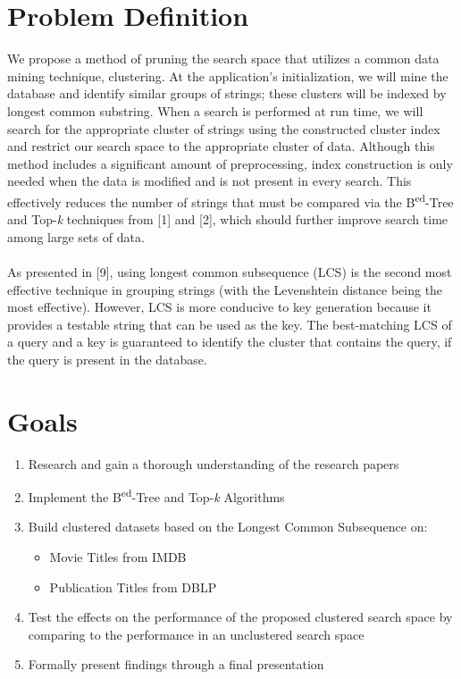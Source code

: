 \documentclass[pdftex,12pt,letter]{article}
\begin{document}
\section{Problem Definition}
We propose a method of pruning the search space that utilizes a common data mining technique, clustering. At the application's initialization, we will mine the database and identify similar groups of strings; these clusters will be indexed by longest common substring. When a search is performed at run time, we will search for the appropriate cluster of strings using the constructed cluster index and restrict our search space to the appropriate cluster of data. Although this method includes a significant amount of preprocessing, index construction is only needed when the data is modified and is not present in every search. This effectively reduces the number of strings that must be compared via the B\textsuperscript{ed}-Tree and Top-\textit{k} techniques from [1] and [2], which should further improve search time among large sets of data.\\
\\
As presented in [9], using longest common subsequence (LCS) is the second most effective technique in grouping strings (with the Levenshtein distance being the most effective). However, LCS is more conducive to key generation because it provides a testable string that can be used as the key. The best-matching LCS of a query and a key is guaranteed to identify the cluster that contains the query, if the query is present in the database. \\

\section{Goals}
\begin{enumerate}
\item Research and gain a thorough understanding of the research papers
\item Implement the B\textsuperscript{ed}-Tree and Top-\textit{k} Algorithms
\item Build clustered datasets based on the Longest Common Subsequence on:
\begin{itemize}
\item Movie Titles from IMDB
\item Publication Titles from DBLP
\end{itemize}
\item Test the effects on the performance of the proposed clustered search space by comparing to the performance in an unclustered search space
\item Formally present findings through a final presentation
\end{enumerate}
\end{document}
